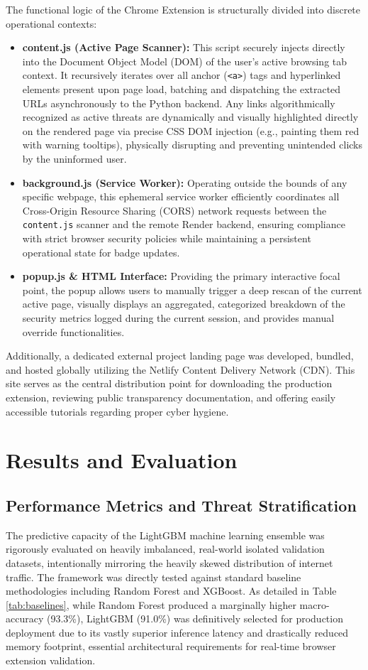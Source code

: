 \documentclass[conference]{IEEEtran}
\begin{document}
The functional logic of the Chrome Extension is structurally divided into discrete operational contexts:
\begin{itemize}
    \item \textbf{content.js (Active Page Scanner):} This script securely injects directly into the Document Object Model (DOM) of the user's active browsing tab context. It recursively iterates over all anchor (\texttt{<a>}) tags and hyperlinked elements present upon page load, batching and dispatching the extracted URLs asynchronously to the Python backend. Any links algorithmically recognized as active threats are dynamically and visually highlighted directly on the rendered page via precise CSS DOM injection (e.g., painting them red with warning tooltips), physically disrupting and preventing unintended clicks by the uninformed user.
    \item \textbf{background.js (Service Worker):} Operating outside the bounds of any specific webpage, this ephemeral service worker efficiently coordinates all Cross-Origin Resource Sharing (CORS) network requests between the \texttt{content.js} scanner and the remote Render backend, ensuring compliance with strict browser security policies while maintaining a persistent operational state for badge updates.
    \item \textbf{popup.js \& HTML Interface:} Providing the primary interactive focal point, the popup allows users to manually trigger a deep rescan of the current active page, visually displays an aggregated, categorized breakdown of the security metrics logged during the current session, and provides manual override functionalities.
\end{itemize}
Additionally, a dedicated external project landing page was developed, bundled, and hosted globally utilizing the Netlify Content Delivery Network (CDN). This site serves as the central distribution point for downloading the production extension, reviewing public transparency documentation, and offering easily accessible tutorials regarding proper cyber hygiene.

\section{Results and Evaluation}

\subsection{Performance Metrics and Threat Stratification}
The predictive capacity of the LightGBM machine learning ensemble was rigorously evaluated on heavily imbalanced, real-world isolated validation datasets, intentionally mirroring the heavily skewed distribution of internet traffic. The framework was directly tested against standard baseline methodologies including Random Forest and XGBoost. As detailed in Table \ref{tab:baselines}, while Random Forest produced a marginally higher macro-accuracy (93.3\%), LightGBM (91.0\%) was definitively selected for production deployment due to its vastly superior inference latency and drastically reduced memory footprint, essential architectural requirements for real-time browser extension validation. 
\end{document}
